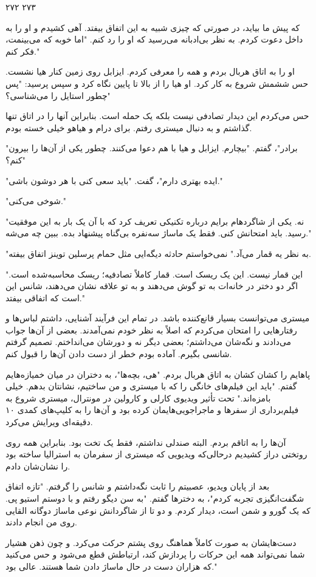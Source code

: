 ۲۷۲ ۲۷۳

که پیش ما بیاید، در صورتی که چیزی شبیه به این اتفاق بیفتد. آهی کشیدم و او را به داخل دعوت کردم. به نظر بی‌ادبانه می‌رسید که او را رد کنم. "اما خوبه که می‌بینمت، فکر کنم." 

او را به اتاق هربال بردم و همه را معرفی کردم. ایزابل روی زمین کنار هیا نشست. حس ششمش شروع به کار کرد. او هیا را از بالا تا پایین نگاه کرد و سپس پرسید: "پس چطور استایل را می‌شناسی؟" 

حس می‌کردم این دیدار تصادفی نیست بلکه یک حمله است. بنابراین آنها را در اتاق تنها گذاشتم و به دنبال میستری رفتم. برای درام و هیاهو خیلی خسته بودم. 

"برادر"، گفتم. "بیچارم. ایزابل و هیا با هم دعوا می‌کنند. چطور یکی از آن‌ها را بیرون کنم؟" 

"ایده بهتری دارم"، گفت. "باید سعی کنی با هر دوشون باشی." 

"شوخی می‌کنی." 

"نه. یکی از شاگردهام برایم درباره تکنیکی تعریف کرد که با آن یک بار به این موفقیت رسید. باید امتحانش کنی. فقط یک ماساژ سه‌نفره بی‌گناه پیشنهاد بده. ببین چه می‌شه." 

"به نظر یه قمار می‌آد." نمی‌خواستم حادثه دیگه‌ایی مثل حمام پرسلین توینز اتفاق بیفته.

"این قمار نیست. این یک ریسک است. قمار کاملاً تصادفیه؛ ریسک محاسبه‌شده است. اگر دو دختر در خانه‌ات به تو گوش می‌دهند و به تو علاقه نشان می‌دهند، شانس این است که اتفاقی بیفتد." 

میستری می‌توانست بسیار قانع‌کننده باشد. در تمام این فرآیند آشنایی، داشتم لباس‌ها و رفتارهایی را امتحان می‌کردم که اصلاً به نظر خودم نمی‌آمدند. بعضی از آن‌ها جواب می‌دادند و نگه‌شان می‌داشتم؛ بعضی دیگر نه و دورشان می‌انداختم. تصمیم گرفتم شانسی بگیرم. آماده بودم خطر از دست دادن آن‌ها را قبول کنم.

پاهایم را کشان کشان به اتاق هربال بردم. "هی، بچه‌ها"، به دختران در میان خمیازه‌هایم گفتم. "باید این فیلم‌های خانگی را که با میستری و من ساختیم، نشانتان بدهم. خیلی بامزه‌اند." تحت تأثیر ویدیوی کارلی و کارولین در مونترال، میستری شروع به فیلم‌برداری از سفرها و ماجراجویی‌هایمان کرده بود و آن‌ها را به کلیپ‌های کمدی ۱۰ دقیقه‌ای ویرایش می‌کرد.

آن‌ها را به اتاقم بردم. البته صندلی نداشتم، فقط یک تخت بود. بنابراین همه روی روتختی دراز کشیدیم درحالی‌که ویدیویی که میستری از سفرمان به استرالیا ساخته بود را نشان‌شان دادم.

بعد از پایان ویدیو، عصبیتم را ثابت نگه‌داشتم و شانس را گرفتم. "تازه اتفاق شگفت‌انگیزی تجربه کردم"، به دخترها گفتم. "به سن دیگو رفتم و با دوستم استیو پی. که یک گورو و شمن است، دیدار کردم. و دو تا از شاگردانش نوعی ماساژ دوگانه القایی روی من انجام دادند.

دست‌هایشان به صورت کاملاً هماهنگ روی پشتم حرکت می‌کرد. و چون ذهن هشیار شما نمی‌تواند همه این حرکات را پردازش کند، ارتباطش قطع می‌شود و حس می‌کنید که هزاران دست در حال ماساژ دادن شما هستند. عالی بود."